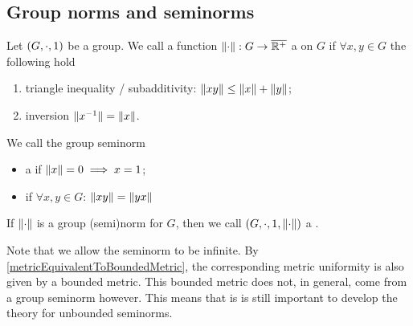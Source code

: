 \subsection{Group norms and seminorms}
\begin{definition}
Let $\sSet{G, \cdot, 1}$ be a group. We call a function $\lVert\cdot\rVert: G\to \overline{\mathbb{R}^+}$ a  on $G$ if $\forall x,y\in G$ the following hold
\begin{enumerate}
\item triangle inequality / subadditivity: $\lVert xy\rVert \leq \lVert x\rVert + \lVert y\rVert$;
\item inversion $\lVert x^{-1}\rVert = \lVert x\rVert$.
\end{enumerate}
We call the group seminorm
\begin{itemize}
\item a  if $\lVert x\rVert = 0 \implies x = 1$;
\item {} if $\forall x,y\in G$: $\lVert xy\rVert = \lVert yx\rVert$
\end{itemize}

If $\lVert\cdot\rVert$ is a group (semi)norm for $G$, then we call $\sSet{G, \cdot, 1, \norm{\cdot}}$ a .
\end{definition}
Note that we allow the seminorm to be infinite. By \ref{metricEquivalentToBoundedMetric}, the corresponding metric uniformity is also given by a bounded metric. This bounded metric does not, in general, come from a group seminorm however. This means that is is still important to develop the theory for unbounded seminorms.

